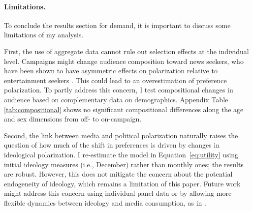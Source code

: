 \documentclass[12pt]{article}
\begin{document}

\FloatBarrier

\paragraph{Limitations.}

To conclude the results section for demand, it is important to discuss some limitations of my analysis. 

First, the use of aggregate data cannot rule out selection effects at the individual level. Campaigns might change audience composition toward news seekers, who have been shown to have asymmetric effects on polarization relative to entertainment seekers \citep{levendusky,arceneaux_johnson_2013}. This could lead to an overestimation of preference polarization. To partly address this concern, I test compositional changes in audience based on complementary data on demographics. Appendix Table \ref{tab:compositional} shows no significant compositional differences along the age and sex dimensions from off- to on-campaign. 


Second, the link between media and political polarization naturally raises the question of how much of the shift in preferences is driven by changes in ideological polarization. I re-estimate the model in Equation~\eqref{eq:utility} using initial ideology measures (i.e., December) rather than monthly ones; the results are robust. However, this does not mitigate the concern about the potential endogeneity of ideology, which remains a limitation of this paper. Future work might address this concern using individual panel data or by allowing more flexible dynamics between ideology and media consumption, as in \cite{martin2017}.
\end{document}
